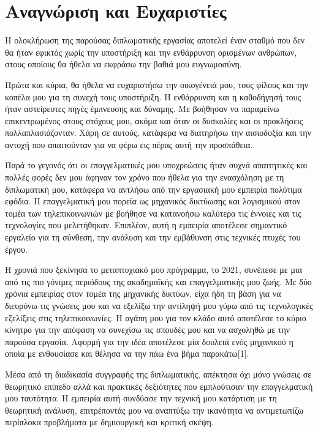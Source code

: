 
\chapter{Αναγνώριση και Ευχαριστίες}

Η ολοκλήρωση της παρούσας διπλωματικής εργασίας αποτελεί έναν σταθμό που δεν θα ήταν εφικτός χωρίς την υποστήριξη και την ενθάρρυνση ορισμένων ανθρώπων, στους οποίους θα ήθελα να εκφράσω την βαθιά μου ευγνωμοσύνη.

Πρώτα και κύρια, θα ήθελα να ευχαριστήσω την οικογένειά μου, τους φίλους και την  κοπέλα μου για τη συνεχή τους υποστήριξη. Η ενθάρρυνση και η καθοδήγησή τους ήταν αστείρευτες πηγές έμπνευσης και δύναμης. Με βοήθησαν να παραμείνω επικεντρωμένος στους στόχους μου, ακόμα και όταν οι δυσκολίες και οι προκλήσεις πολλαπλασιάζονταν. Χάρη σε αυτούς, κατάφερα να διατηρήσω την αισιοδοξία και την αντοχή που απαιτούνταν για να φέρω εις πέρας αυτή την προσπάθεια.

Παρά το γεγονός ότι οι επαγγελματικές μου υποχρεώσεις ήταν συχνά απαιτητικές και πολλές φορές δεν μου άφηναν τον χρόνο που ήθελα για την ενασχόληση με τη διπλωματική μου, κατάφερα να αντλήσω από την εργασιακή μου εμπειρία πολύτιμα εφόδια. Η επαγγελματική μου πορεία ως μηχανικός δικτύωσης και λογισμικού στον τομέα των τηλεπικοινωνιών με βοήθησε να κατανοήσω καλύτερα τις έννοιες και τις τεχνολογίες που μελετήθηκαν. Επιπλέον, αυτή η εμπειρία αποτέλεσε σημαντικό εργαλείο για τη σύνθεση, την ανάλυση και την εμβάθυνση στις τεχνικές πτυχές του έργου.

Η χρονιά που ξεκίνησα το μεταπτυχιακό μου πρόγραμμα, το 2021, συνέπεσε με μια από τις πιο γόνιμες περιόδους της ακαδημαϊκής και επαγγελματικής μου ζωής. Με δύο χρόνια εμπειρίας στον τομέα της μηχανικής δικτύων, είχα ήδη τη βάση για να διευρύνω τις γνώσεις μου και να εξελίξω την αντίληψή μου γύρω από τις τεχνολογικές εξελίξεις στις τηλεπικοινωνίες. Η αγάπη μου για τον κλάδο αυτό αποτέλεσε το κύριο κίνητρο για την απόφαση να συνεχίσω τις σπουδές μου και να ασχοληθώ με την παρούσα εργασία. Αφορμή για την ιδέα αποτέλεσε μία δουλειά ενός μηχανικού η οποία με ενθουσίασε και θέλησα να την πάω ένα βήμα παρακάτω[1].

Μέσα από τη διαδικασία συγγραφής της διπλωματικής, απέκτησα όχι μόνο γνώσεις σε θεωρητικό επίπεδο αλλά και πρακτικές δεξιότητες που εμπλούτισαν την επαγγελματική μου ταυτότητα. Η εμπειρία αυτή συνδύασε την τεχνική μου κατάρτιση με τη θεωρητική ανάλυση, επιτρέποντάς μου να αναπτύξω την ικανότητα να αντιμετωπίζω περίπλοκα προβλήματα με δημιουργική και κριτική σκέψη.

